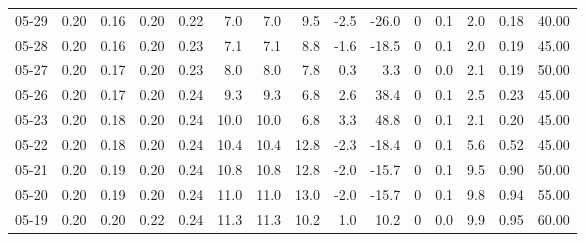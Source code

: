 \begin{threeparttable}
{\begin{tabular}{lrrrrrrrrrrrrrr}
  05-29 &          0.20 &          0.16 &          0.20 &        0.22 &                 7.0 &                7.0 &                 9.5 &       -2.5 &        -26.0 &              0 &                 0.1 &              2.0 &            0.18 &                  40.00 \\
  05-28 &          0.20 &          0.16 &          0.20 &        0.23 &                 7.1 &                7.1 &                 8.8 &       -1.6 &        -18.5 &              0 &                 0.1 &              2.0 &            0.19 &                  45.00 \\
  05-27 &          0.20 &          0.17 &          0.20 &        0.23 &                 8.0 &                8.0 &                 7.8 &        0.3 &          3.3 &              0 &                 0.0 &              2.1 &            0.19 &                  50.00 \\
  05-26 &          0.20 &          0.17 &          0.20 &        0.24 &                 9.3 &                9.3 &                 6.8 &        2.6 &         38.4 &              0 &                 0.1 &              2.5 &            0.23 &                  45.00 \\
  05-23 &          0.20 &          0.18 &          0.20 &        0.24 &                10.0 &               10.0 &                 6.8 &        3.3 &         48.8 &              0 &                 0.1 &              2.1 &            0.20 &                  45.00 \\
  05-22 &          0.20 &          0.18 &          0.20 &        0.24 &                10.4 &               10.4 &                12.8 &       -2.3 &        -18.4 &              0 &                 0.1 &              5.6 &            0.52 &                  45.00 \\
  05-21 &          0.20 &          0.19 &          0.20 &        0.24 &                10.8 &               10.8 &                12.8 &       -2.0 &        -15.7 &              0 &                 0.1 &              9.5 &            0.90 &                  50.00 \\
  05-20 &          0.20 &          0.19 &          0.20 &        0.24 &                11.0 &               11.0 &                13.0 &       -2.0 &        -15.7 &              0 &                 0.1 &              9.8 &            0.94 &                  55.00 \\
  05-19 &          0.20 &          0.20 &          0.22 &        0.24 &                11.3 &               11.3 &                10.2 &        1.0 &         10.2 &              0 &                 0.0 &              9.9 &            0.95 &                  60.00 \\

\end{tabular}}
\end{threeparttable}
